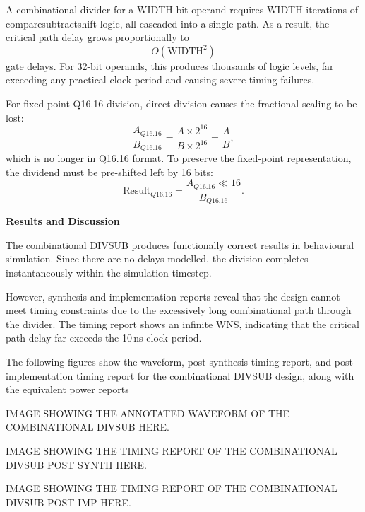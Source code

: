 \documentclass[a4paper,12pt]{article}
\begin{document}
A combinational divider for a WIDTH-bit operand requires WIDTH iterations of compare\-subtract\-shift logic, all cascaded into a single path. As a result, the critical path delay grows proportionally to
\begin{equation}
O(\text{WIDTH}^2)
\end{equation}
gate delays. For 32-bit operands, this produces thousands of logic levels, far exceeding any practical clock period and causing severe timing failures.

For fixed-point Q16.16 division, direct division causes the fractional scaling to be lost:
\begin{equation}
\frac{A_{Q16.16}}{B_{Q16.16}} = \frac{A \times 2^{16}}{B \times 2^{16}} = \frac{A}{B},
\end{equation}
which is no longer in Q16.16 format. To preserve the fixed-point representation, the dividend must be pre-shifted left by 16 bits:
\begin{equation}
\text{Result}_{Q16.16} = \frac{A_{Q16.16} \ll 16}{B_{Q16.16}}.
\end{equation}

\textbf{Results and Discussion}

The combinational DIVSUB produces functionally correct results in behavioural simulation. Since there are no delays modelled, the division completes instantaneously within the simulation timestep.

However, synthesis and implementation reports reveal that the design cannot meet timing constraints due to the excessively long combinational path through the divider. The timing report shows an infinite WNS, indicating that the critical path delay far exceeds the 10\,ns clock period.

The following figures show the waveform, post-synthesis timing report, and post-implementation timing report for the combinational DIVSUB design, along with the equivalent power reports

\begin{large}
    IMAGE SHOWING THE ANNOTATED WAVEFORM OF THE COMBINATIONAL DIVSUB HERE.
\end{large}

\begin{large}
    IMAGE SHOWING THE TIMING REPORT OF THE COMBINATIONAL DIVSUB POST SYNTH HERE.
\end{large}

\begin{large}
    IMAGE SHOWING THE TIMING REPORT OF THE COMBINATIONAL DIVSUB POST IMP HERE.
\end{large}
\end{document}

